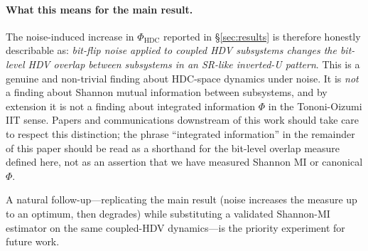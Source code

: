 \documentclass[12pt,a4paper]{article}
\begin{document}
\paragraph{What this means for the main result.}
The noise-induced increase in $\Phi_{\text{HDC}}$ reported in \S\ref{sec:results}
is therefore honestly describable as: \emph{bit-flip noise applied to
coupled HDV subsystems changes the bit-level HDV overlap between
subsystems in an SR-like inverted-U pattern}. This is a genuine and
non-trivial finding about HDC-space dynamics under noise. It is
\emph{not} a finding about Shannon mutual information between
subsystems, and by extension it is not a finding about integrated
information $\Phi$ in the Tononi-Oizumi IIT sense. Papers and
communications downstream of this work should take care to respect
this distinction; the phrase ``integrated information'' in the
remainder of this paper should be read as a shorthand for the
bit-level overlap measure defined here, not as an assertion that we
have measured Shannon MI or canonical $\Phi$.

A natural follow-up---replicating the main result (noise increases
the measure up to an optimum, then degrades) while substituting a
validated Shannon-MI estimator on the same coupled-HDV dynamics---is
the priority experiment for future work.
\end{document}
